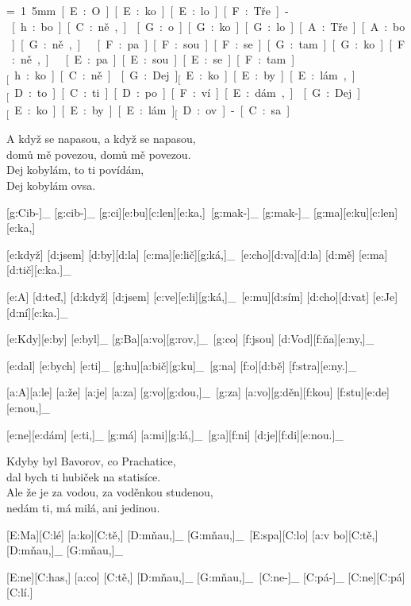 
{\unit=1.5mm
[E:O][E:ko][E:lo] [F:Tře]-[h:bo][C:ně,]_\

[G:o][G:ko][G:lo] [A:Tře][A:bo][G:ně,]\
[F:pa][F:sou] [F:se] [G:tam] [G:ko][F:ně,]\

[E:pa][E:sou] [E:se] [F:tam]_ [h:ko][C:ně.]_\

[G:Dej]_ [E:ko][E:by][E:lám,]_ [D:to] [C:ti] [D:po][F:ví][E:dám,]_\

[G:Dej]_ [E:ko][E:by][E:lám]_ [D:ov]-[C:sa.]_\
}

A když se napasou, a když se napasou,\\
domů mě povezou, domů mě povezou.\\
Dej kobylám, to ti povídám,\\
Dej kobylám ovsa.



[g:Cib-]_ [g:cib-]_ [g:ci][e:bu][c:len][e:ka,]\
[g:mak-]_ [g:mak-]_ [g:ma][e:ku][c:len][e:ka,]\

[e:když] [d:jsem] [d:by][d:la] [c:ma][e:lič][g:ká,]_\
[e:cho][d:va][d:la] [d:mě] [e:ma][d:tič][c:ka.]_\

[e:A] [d:teď,] [d:když] [d:jsem] [c:ve][e:li][g:ká,]_\
[e:mu][d:sím] [d:cho][d:vat] [e:Je][d:ní][c:ka.]_\



[e:Kdy][e:by] [e:byl]_ [g:Ba][a:vo][g:rov,]_\
[g:co] [f:jsou] [d:Vod][f:ňa][e:ny,]_\

[e:dal] [e:bych] [e:ti]_ [g:hu][a:bič][g:ku]_\
[g:na] [f:o][d:bě] [f:stra][e:ny.]_\

[a:A][a:le] [a:že] [a:je] [a:za] [g:vo][g:dou,]_\
[g:za] [a:vo][g:děn][f:kou] [f:stu][e:de][e:nou,]_\

[e:ne][e:dám] [e:ti,]_ [g:má] [a:mi][g:lá,]_\
[g:a][f:ni] [d:je][f:di][e:nou.]_\

Kdyby byl Bavorov, co Prachatice,\\
dal bych ti hubiček na statisíce.\\
Ale že je za vodou, za voděnkou studenou,\\
nedám ti, má milá, ani jedinou.


\pis{Malé kotě}{a}{G}

[E:Ma][C:lé] [a:ko][C:tě,] [D:mňau,]_ [G:mňau,]_\
[E:spa][C:lo] [a:v bo][C:tě,] [D:mňau,]_ [G:mňau,]_\

[E:ne][C:has,] [a:co] [C:tě,] [D:mňau,]_ [G:mňau,]_\
[C:ne-]_ [C:pá-]_ [C:ne][C:pá][C:lí.]\

